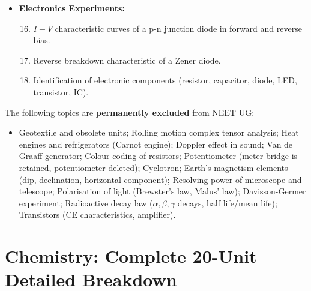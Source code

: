 \documentclass[11pt,a4paper]{article}
\begin{document}
\begin{itemize}
  \begin{enumerate}
    \setcounter{enumi}{12}
    \item Focal length of: (i) Convex mirror, (ii) Concave mirror, (iii) Convex lens using $u-v$ method.
    \item Refractive index of a glass slab using a traveling microscope.
    \item Refractive index of a glass prism using angle of minimum deviation graph.
  \end{enumerate}
  \item \textbf{Electronics Experiments:}
  \begin{enumerate}
    \setcounter{enumi}{15}
    \item $I-V$ characteristic curves of a p-n junction diode in forward and reverse bias.
    \item Reverse breakdown characteristic of a Zener diode.
    \item Identification of electronic components (resistor, capacitor, diode, LED, transistor, IC).
  \end{enumerate}
\end{itemize}

\begin{trapbox}
The following topics are \textbf{permanently excluded} from NEET UG:
\begin{itemize}
  \item Geotextile and obsolete units; Rolling motion complex tensor analysis; Heat engines and refrigerators (Carnot engine); Doppler effect in sound; Van de Graaff generator; Colour coding of resistors; Potentiometer (meter bridge is retained, potentiometer deleted); Cyclotron; Earth's magnetism elements (dip, declination, horizontal component); Resolving power of microscope and telescope; Polarisation of light (Brewster's law, Malus' law); Davisson-Germer experiment; Radioactive decay law ($\alpha, \beta, \gamma$ decays, half life/mean life); Transistors (CE characteristics, amplifier).
\end{itemize}
\end{trapbox}

\newpage

\section{Chemistry: Complete 20-Unit Detailed Breakdown}
\end{document}
